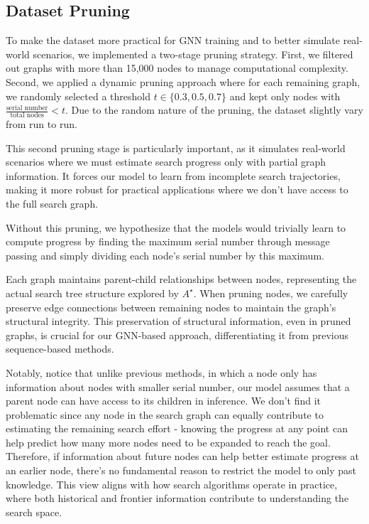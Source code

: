 \documentclass[letterpaper]{article}
\begin{document}
\subsection{Dataset Pruning}

To make the dataset more practical for GNN training and to better simulate real-world scenarios, we implemented a two-stage pruning strategy. First, we filtered out graphs with more than 15,000 nodes to manage computational complexity. Second, we applied a dynamic pruning approach where for each remaining graph, we randomly selected a threshold $t \in \{0.3, 0.5, 0.7\}$ and kept only nodes with $\frac{\text{serial number}}{\text{total nodes}} < t$. Due to the random nature of the pruning, the dataset slightly vary from run to run.

This second pruning stage is particularly important, as it simulates real-world scenarios where we must estimate search progress only with partial graph information. It forces our model to learn from incomplete search trajectories, making it more robust for practical applications where we don't have access to the full search graph.

Without this pruning, we hypothesize that the models would trivially learn to compute progress by finding the maximum serial number through message passing and simply dividing each node's serial number by this maximum.

Each graph maintains parent-child relationships between nodes, representing the actual search tree structure explored by $A^{\star}$. When pruning nodes, we carefully preserve edge connections between remaining nodes to maintain the graph's structural integrity. This preservation of structural information, even in pruned graphs, is crucial for our GNN-based approach, differentiating it from previous sequence-based methods.

Notably, notice that unlike previous methods, in which a node only has information about nodes with smaller serial number, our model assumes that a parent node can have access to its children in inference. We don't find it problematic since any node in the search graph can equally contribute to estimating the remaining search effort - knowing the progress at any point can help predict how many more nodes need to be expanded to reach the goal. Therefore, if information about future nodes can help better estimate progress at an earlier node, there's no fundamental reason to restrict the model to only past knowledge. This view aligns with how search algorithms operate in practice, where both historical and frontier information contribute to understanding the search space.
\end{document}
